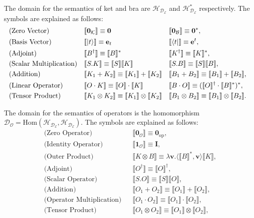\documentclass[manuscript, review, timestamp]{acmart}
\newcommand*{\sem}[1]{\llbracket #1 \rrbracket}
\begin{document}
\begin{definition}
  The domain for the semantics of ket and bra are $\mathcal{H}_{\mathcal{D}_\mathcal{E}}$ and $\mathcal{H}_{\mathcal{D}_\mathcal{E}}^*$ respectively.
  The symbols are explained as follows:
  \begin{align*}
    & \text{(Zero Vector)} &&
    \sem{\mathbf{0}_\mathcal{K}} \equiv \mathbf{0} && \sem{\mathbf{0}_\mathcal{B}} \equiv \mathbf{0}^*, \\
    & \text{(Basis Vector)} &&
    \sem{\ket{t}} \equiv \mathbf{e}_t && \sem{\bra{t}} \equiv \mathbf{e}^t, \\
    & \text{(Adjoint)} &&
    \sem{B^\dagger} \equiv \sem{B}^* && \sem{K^\dagger} \equiv \sem{K}^*, \\
    & \text{(Scalar Multiplication)} &&
    \sem{S.K} \equiv \sem{S} \sem{K} && \sem{S.B} \equiv \sem{S} \sem{B}, \\
    & \text{(Addition)} &&
    \sem{K_1 + K_2} \equiv \sem{K_1} + \sem{K_2} && \sem{B_1 + B_2} \equiv \sem{B_1} + \sem{B_2}, \\
    & \text{(Linear Operator)} &&
    \sem{O \cdot K} \equiv \sem{O} \cdot \sem{K} && \sem{B \cdot O} \equiv (\sem{O}^\dagger \cdot \sem{B}^*)^*, \\
    & \text{(Tensor Product)} &&
    \sem{K_1 \otimes K_2} \equiv \sem{K_1} \otimes \sem{K_2} && \sem{B_1 \otimes B_2} \equiv \sem{B_1} \otimes \sem{B_2}.
  \end{align*}
\end{definition}



\begin{definition}
  The domain for the semantics of operators is the homomorphism $\mathcal{D}_\mathcal{O} = \textrm{Hom}(\mathcal{H}_{\mathcal{D}_\mathcal{E}}, \mathcal{H}_{\mathcal{D}_\mathcal{E}})$.
  The symbols are explained as follows:
  \begin{align*}
    & \text{(Zero Operator)} &&
    \sem{\mathbf{0}_\mathcal{O}} \equiv \mathbf{0}_{\textrm{op}}, \\
    & \text{(Identity Operator)} &&
    \sem{\mathbf{1}_\mathcal{O}} \equiv \mathbf{I}, \\
    & \text{(Outer Product)} &&
    \sem{K \otimes B} \equiv \lambda \mathbf{v}. \langle \sem{B}^*, \mathbf{v}\rangle \sem{K}, \\
    & \text{(Adjoint)} &&
    \sem{O^\dagger} \equiv \sem{O}^\dagger, \\
    & \text{(Scalar Operator)} &&
    \sem{S.O} \equiv \sem{S} \sem{O}, \\
    & \text{(Addition)} &&
    \sem{O_1 + O_2} \equiv \sem{O_1}+\sem{O_2}, \\
    & \text{(Operator Multiplication)} &&
    \sem{O_1 \cdot O_2} \equiv \sem{O_1} \cdot \sem{O_2}, \\
    & \text{(Tensor Product)} &&
    \sem{O_1 \otimes O_2} \equiv \sem{O_1} \otimes \sem{O_2},
  \end{align*}
\end{definition}
\end{document}
